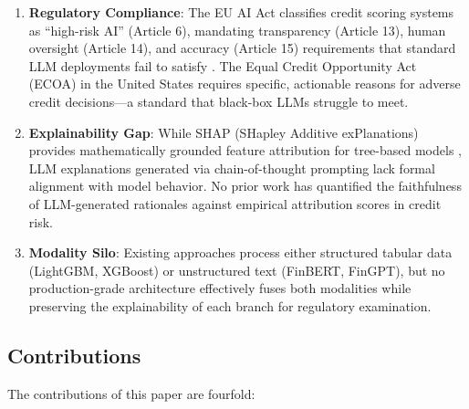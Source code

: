 \documentclass[11pt,a4paper]{article}
\begin{document}
\begin{enumerate}
    \item \textbf{Regulatory Compliance}: The EU AI Act classifies credit scoring systems as ``high-risk AI'' (Article 6), mandating transparency (Article 13), human oversight (Article 14), and accuracy (Article 15) requirements that standard LLM deployments fail to satisfy \citep{euaiact2024}. The Equal Credit Opportunity Act (ECOA) in the United States requires specific, actionable reasons for adverse credit decisions---a standard that black-box LLMs struggle to meet.
    
    \item \textbf{Explainability Gap}: While SHAP (SHapley Additive exPlanations) provides mathematically grounded feature attribution for tree-based models \citep{lundberg2017shap}, LLM explanations generated via chain-of-thought prompting lack formal alignment with model behavior. No prior work has quantified the faithfulness of LLM-generated rationales against empirical attribution scores in credit risk.
    
    \item \textbf{Modality Silo}: Existing approaches process either structured tabular data (LightGBM, XGBoost) or unstructured text (FinBERT, FinGPT), but no production-grade architecture effectively fuses both modalities while preserving the explainability of each branch for regulatory examination.
\end{enumerate}

\subsection{Contributions}

The contributions of this paper are fourfold:
\end{document}
